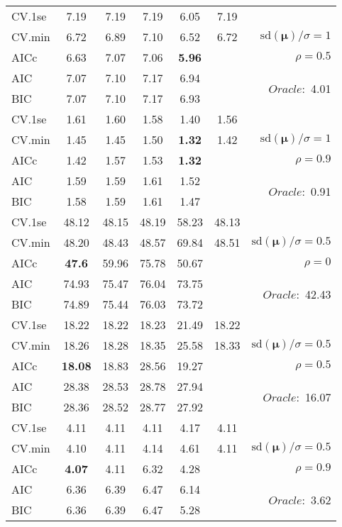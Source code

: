 \begin{table}
\begin{center}
\begin{tabular}{l*{5}{c}|r}
 \hline 
CV.1se & 7.19 & 7.19 & 7.19 & 6.05 & 7.19 & \\
CV.min & 6.72 & 6.89 & 7.10 & 6.52 & 6.72 &  $\mathrm{sd}(\mathbf{\mu})/\sigma=1$ \\
AICc & 6.63 & 7.07 & 7.06 & {\bf 5.96} & & $\rho=0.5$ \\
AIC & 7.07 & 7.10 & 7.17 & 6.94 & &  \multirow{2}{*}{$Oracle: $ 4.01} \\
BIC & 7.07 & 7.10 & 7.17 & 6.93 & &  \\
 \hline 
CV.1se & 1.61 & 1.60 & 1.58 & 1.40 & 1.56 & \\
CV.min & 1.45 & 1.45 & 1.50 & {\bf 1.32} & 1.42 &  $\mathrm{sd}(\mathbf{\mu})/\sigma=1$ \\
AICc & 1.42 & 1.57 & 1.53 & {\bf 1.32} & & $\rho=0.9$ \\
AIC & 1.59 & 1.59 & 1.61 & 1.52 & &  \multirow{2}{*}{$Oracle: $ 0.91} \\
BIC & 1.58 & 1.59 & 1.61 & 1.47 & &  \\
 \hline 
CV.1se & 48.12 & 48.15 & 48.19 & 58.23 & 48.13 & \\
CV.min & 48.20 & 48.43 & 48.57 & 69.84 & 48.51 &  $\mathrm{sd}(\mathbf{\mu})/\sigma=0.5$ \\
AICc & {\bf 47.6} & 59.96 & 75.78 & 50.67 & & $\rho=0$ \\
AIC & 74.93 & 75.47 & 76.04 & 73.75 & &  \multirow{2}{*}{$Oracle: $ 42.43} \\
BIC & 74.89 & 75.44 & 76.03 & 73.72 & &  \\
 \hline 
CV.1se & 18.22 & 18.22 & 18.23 & 21.49 & 18.22 & \\
CV.min & 18.26 & 18.28 & 18.35 & 25.58 & 18.33 &  $\mathrm{sd}(\mathbf{\mu})/\sigma=0.5$ \\
AICc & {\bf 18.08} & 18.83 & 28.56 & 19.27 & & $\rho=0.5$ \\
AIC & 28.38 & 28.53 & 28.78 & 27.94 & &  \multirow{2}{*}{$Oracle: $ 16.07} \\
BIC & 28.36 & 28.52 & 28.77 & 27.92 & &  \\
 \hline 
CV.1se & 4.11 & 4.11 & 4.11 & 4.17 & 4.11 & \\
CV.min & 4.10 & 4.11 & 4.14 & 4.61 & 4.11 &  $\mathrm{sd}(\mathbf{\mu})/\sigma=0.5$ \\
AICc & {\bf 4.07} & 4.11 & 6.32 & 4.28 & & $\rho=0.9$ \\
AIC & 6.36 & 6.39 & 6.47 & 6.14 & &  \multirow{2}{*}{$Oracle: $ 3.62} \\
BIC & 6.36 & 6.39 & 6.47 & 5.28 & &  \\
 \hline 
\end{tabular}
\end{center}
\vspace{-1cm}
\end{table}





